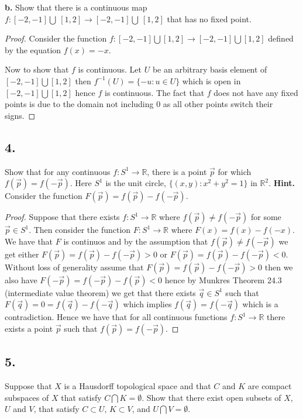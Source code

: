 \documentclass{amsart}
\theoremstyle{plain}
\theoremstyle{definition}
\theoremstyle{remark}
\begin{document}
\vspace{.1in}
{\bfseries b.} Show that there is a continuous map $f : [-2, -1] \bigcup  \ [1,2] \rightarrow [-2, -1] \bigcup \ [1,2]$ that has no fixed point.  

\begin{proof}
    Consider the function $f:[-2,-1]\bigcup [1,2]\to [-2,-1]\bigcup [1,2]$ defined by the equation $f(x)=-x$. 

    Now to show that $f$ is continuous. Let $U$ be an arbitrary basis element of $[-2,-1]\bigcup [1,2]$ then $f^{-1}(U)=\{-u:u\in U\}$ which is open in $[-2,-1]\bigcup [1,2]$ hence $f$ is continuous. The fact that $f$ does not have any fixed points is due to the domain not including $0$ as all other points switch their signs. 
\end{proof}

\vspace{.15in}
\noindent
\subsection*{4.} Show that for any continuous $f : S^1 \rightarrow \mathbb R$, there is a point $\vec{p}$ for which $f(\vec{p}) = f(-\vec{p})$. Here $S^1$ is the unit circle, $\{ (x,y) : x^2 + y^2 = 1\}$ in $\mathbb R ^2$. {\bfseries Hint.} Consider the function $F(\vec{p}) = f(\vec{p}) - f(-\vec{p})$.

\begin{proof}
    Suppose that there exists $f:S^1\to \mathbb{R}$ where $f(\vec p)\not = f(-\vec p)$ for some $\vec p \in S^1$. Then consider the function $F:S^1 \to \mathbb{R}$ where $F(x)=f(x)-f(-x)$. We have that $F$ is continuos and by the assumption that $f(\vec p)\not = f(-\vec p)$ we get either $F(\vec{p})=f(\vec p)-f(-\vec p)>0$ or $F(\vec{p})=f(\vec p)-f(-\vec p)<0$. Without loss of generality assume that $F(\vec{p})=f(\vec p)-f(-\vec p)>0$ then we also have $F(-\vec p)= f(-\vec p)-f(\vec p)<0$ hence by Munkres Theorem 24.3 (intermediate value theorem) we get that there exists $\vec{q}\in S^1$ such that $F(\vec{q})=0=f(\vec{q})-f(-\vec{q})$ which implies $f(\vec{q})=f(-\vec{q})$ which is a contradiction. Hence we have that for all continuous functions $f:S^1\to \mathbb{R}$ there exists a point $\vec{p}$ such that $f(\vec{p})=f(-\vec{p})$.
\end{proof}





\vspace{.15in}
\noindent
\subsection*{5.} Suppose that $X$ is a Hausdorff topological space and that $C$ and $K$ are compact subspaces of $X$ that satisfy $C\bigcap K = \emptyset$. Show that there exist open subsets of $X$, $U$ and $V$, that satisfy $C\subset U$, $K\subset V$, and $U\bigcap V = \emptyset$.
\end{document}
